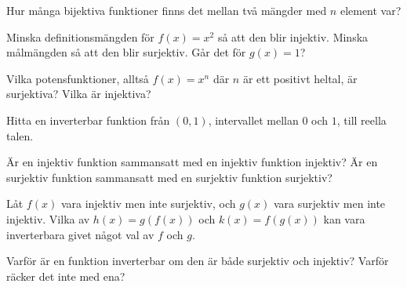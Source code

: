 \begin{problem}
	Hur många bijektiva funktioner finns det mellan två mängder med \(n\) element var?
\end{problem}


\begin{problem}
	Minska definitionsmängden för \(f(x)=x^2\) så att den blir injektiv. Minska målmängden så att den blir surjektiv. Går det för \(g(x) = 1\)?
\end{problem}

\begin{problem}
	Vilka potensfunktioner, alltså \(f(x) = x^n\) där \(n\) är ett positivt heltal, är surjektiva? Vilka är injektiva?
\end{problem}

\begin{problem}
	Hitta en inverterbar funktion från \((0, 1)\), intervallet mellan \(0\) och \(1\), till reella talen.
\end{problem}


\begin{problem}
	Är en injektiv funktion sammansatt med en injektiv funktion injektiv? Är en surjektiv funktion sammansatt med en surjektiv funktion surjektiv?
\end{problem}

\begin{problem}
	Låt \(f(x)\) vara injektiv men inte surjektiv, och \(g(x)\) vara surjektiv men inte injektiv. Vilka av \(h(x) = g(f(x))\) och \(k(x) = f(g(x))\) kan vara inverterbara givet något val av \(f\) och \(g\).
\end{problem}

\begin{problem}
	Varför är en funktion inverterbar om den är både surjektiv och injektiv? Varför räcker det inte med ena?
\end{problem}

